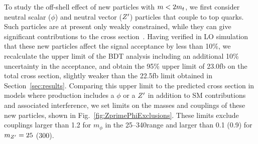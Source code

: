 To study the off-shell effect of new particles with $m < 2m_t$, we first
consider neutral scalar ($\phi$) and neutral vector ($Z^\prime$) particles that
couple to top quarks. Such particles are at present only weakly constrained,
while they can give significant contributions to the \tttt cross
section~\cite{THEORY:Alvarez2016nrz}. Having verified in LO simulation that these
new particles affect the signal acceptance by less than 10\%, we recalculate
the \xsectttt upper limit of the BDT analysis including an additional 10\%
uncertainty in the acceptance, and obtain the 95\% \CL upper limit of
23.0\unit{fb} on the total \tttt cross section, slightly weaker than the
22.5\unit{fb} limit obtained in Section~\ref{sec:results}. Comparing this
upper limit to the predicted cross section in models where \tttt production
includes a $\phi$ or a $Z^\prime$ in addition to SM contributions and
associated interference, we set limits on the masses and couplings of these
new particles, shown in Fig.~\ref{fig:ZprimePhiExclusions}. These limits
exclude couplings larger than 1.2 for $m_{\phi}$ in the 25--340\GeV range and
larger than 0.1 (0.9) for $m_{Z^\prime} = 25$ (300)\GeV.

